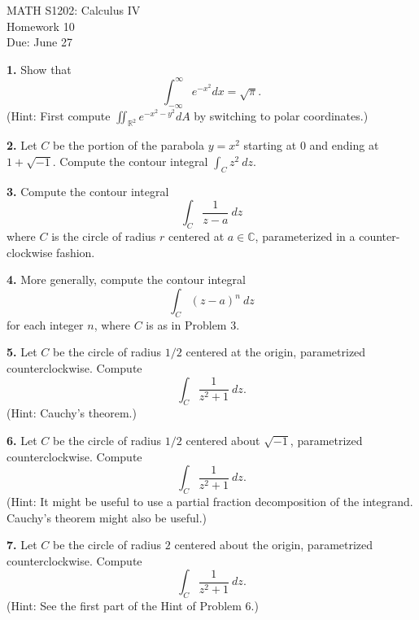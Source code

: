 \documentclass{article}
\begin{document}
\begin{center}
MATH S1202: Calculus IV \\ 
Homework 10 \\
Due: June 27
\end{center}

\noindent \textbf{1.} Show that 
\[
\int_{-\infty}^\infty e^{-x^2}dx = \sqrt{\pi}.
\]
(Hint: First compute $\iint_{\mathbb{R}^2} e^{-x^2 -y^2} dA$ by switching to polar coordinates.)

\vspace{3mm}

\noindent \textbf{2.} Let $C$ be the portion of the parabola $y = x^2$ starting at $0$ and ending at $1 + \sqrt{-1}$. Compute the contour integral $\int_C z^2 \: dz$. 

\vspace{3mm}

\noindent \textbf{3.} Compute the contour integral 
\[
\int_C \frac{1}{z - a} \: dz
\]
where $C$ is the circle of radius $r$ centered at $a \in \mathbb{C}$, parameterized in a counter-clockwise fashion. 

\vspace{3mm}

\noindent \textbf{4.} More generally, compute the contour integral 
\[
\int_C (z-a)^n \: dz
\]
for each integer $n$, where $C$ is as in Problem 3. 

\vspace{3mm}

\noindent \textbf{5.} Let $C$ be the circle of radius $1/2$ centered at the origin, parametrized counterclockwise. Compute 
\[
\int_C \frac{1}{z^2 + 1} \: dz.
\]
(Hint: Cauchy's theorem.)

\vspace{3mm}

\noindent \textbf{6.} Let $C$ be the circle of radius $1/2$ centered about $\sqrt{-1}$, parametrized counterclockwise. Compute 
\[
\int_C \frac{1}{z^2 + 1} \: dz.
\] 
(Hint: It might be useful to use a partial fraction decomposition of the integrand. Cauchy's theorem might also be useful.)

\vspace{3mm}

\noindent \textbf{7.} Let $C$ be the circle of radius $2$ centered about the origin, parametrized counterclockwise. Compute 
\[
\int_C \frac{1}{z^2 + 1} \: dz. 
\]
(Hint: See the first part of the Hint of Problem 6.)

\vspace{3mm}
\end{document}
